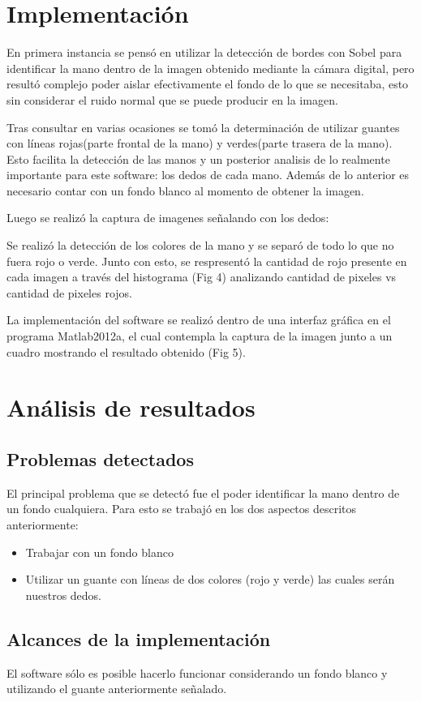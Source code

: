 \documentclass[journal]{IEEEtran}
\begin{document}
\section{Implementación}

En primera instancia se pensó en utilizar la detección de bordes con Sobel para identificar la mano dentro de la imagen obtenido mediante la cámara digital, pero resultó complejo poder aislar efectivamente el fondo de lo que se necesitaba, esto sin considerar el ruido normal que se puede producir en la imagen.

Tras consultar en varias ocasiones se tomó la determinación de utilizar guantes con líneas rojas(parte frontal de la mano) y verdes(parte trasera de la mano). Esto facilita la detección de las manos y un posterior analisis de lo realmente importante para este software: los dedos de cada mano. Además de lo anterior es necesario contar con un fondo blanco al momento de obtener la imagen.

Luego se realizó la captura de imagenes señalando con los dedos:


Se realizó la detección de los colores de la mano y se separó de todo lo que no fuera rojo o verde. Junto con esto, se respresentó la cantidad de rojo presente en cada imagen a través del histograma (Fig 4) analizando cantidad de pixeles vs cantidad de pixeles rojos.

	
La implementación del software se realizó dentro de una interfaz gráfica en el programa Matlab2012a, el cual contempla la captura de la imagen junto a un cuadro mostrando el resultado obtenido (Fig 5).


\section{Análisis de resultados}
\subsection{Problemas detectados}
	El principal problema que se detectó fue el poder identificar la mano dentro de un fondo cualquiera. Para esto se trabajó en los dos aspectos descritos anteriormente:
	\begin{itemize}
		\item Trabajar con un fondo blanco
		\item Utilizar un guante con líneas de dos colores (rojo y verde) las cuales serán nuestros dedos.
	\end{itemize}
\subsection{Alcances de la implementación}
	El software sólo es posible hacerlo funcionar considerando un fondo blanco y utilizando el guante anteriormente señalado.
	
\end{document}
